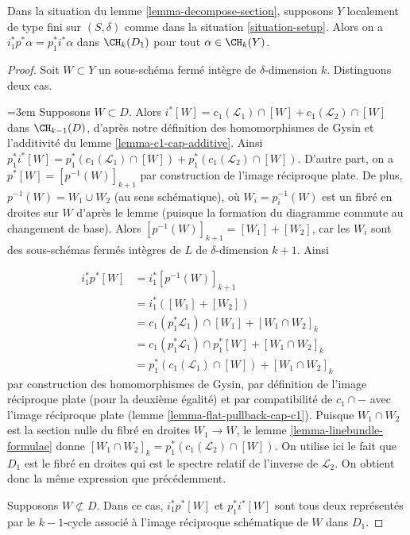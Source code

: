 \begin{lemma}
\label{lemma-decompose-section-formulae}
Dans la situation du lemme \ref{lemma-decompose-section},
supposons $Y$ localement de type fini sur $(S, \delta)$ comme dans la
situation \ref{situation-setup}. Alors on a
$i_1^*p^*\alpha = p_1^*i^*\alpha$
dans $\CH_k(D_1)$ pour tout $\alpha \in \CH_k(Y)$.
\end{lemma}

\begin{proof}
Soit $W \subset Y$ un sous-schéma fermé intègre de $\delta$-dimension $k$.
Distinguons deux cas.

{\emergencystretch=3em\medskip\noindent
Supposons $W \subset D$. Alors
$i^*[W] = c_1(\mathcal{L}_1) \cap [W] + c_1(\mathcal{L}_2) \cap [W]$
dans $\CH_{k - 1}(D)$, d'après notre définition des homomorphismes de Gysin et
l'additivité du lemme \ref{lemma-c1-cap-additive}.
Ainsi $p_1^*i^*[W] =
p_1^*(c_1(\mathcal{L}_1) \cap [W]) + p_1^*(c_1(\mathcal{L}_2) \cap [W])$.
D'autre part, on a
$p^*[W] = [p^{-1}(W)]_{k + 1}$ par construction de l'image réciproque plate.
De plus, $p^{-1}(W) = W_1 \cup W_2$ (au sens schématique),
où $W_i = p_i^{-1}(W)$ est un fibré en droites sur $W$
d'après le lemme (puisque la formation du diagramme commute au changement de base).
Alors $[p^{-1}(W)]_{k + 1} = [W_1] + [W_2]$, car les $W_i$ sont des sous-schémas fermés
intègres de $L$ de $\delta$-dimension $k + 1$. Ainsi\par}
\begin{align*}
i_1^*p^*[W]
& =
i_1^*[p^{-1}(W)]_{k + 1} \\
& =
i_1^*([W_1] + [W_2]) \\
& =
c_1(p_1^*\mathcal{L}_1) \cap [W_1] + [W_1 \cap W_2]_k \\
& =
c_1(p_1^*\mathcal{L}_1) \cap p_1^*[W] + [W_1 \cap W_2]_k \\
& =
p_1^*(c_1(\mathcal{L}_1) \cap [W]) + [W_1 \cap W_2]_k
\end{align*}
par construction des homomorphismes de Gysin, par définition de l'image réciproque plate
(pour la deuxième égalité) et par compatibilité de $c_1 \cap -$
avec l'image réciproque plate (lemme \ref{lemma-flat-pullback-cap-c1}).
Puisque $W_1 \cap W_2$ est la section nulle du fibré en droites
$W_1 \to W$, le lemme \ref{lemma-linebundle-formulae} donne
$[W_1 \cap W_2]_k = p_1^*(c_1(\mathcal{L}_2) \cap [W])$.
On utilise ici le fait que $D_1$ est le fibré en droites
qui est le spectre relatif de l'inverse de $\mathcal{L}_2$.
On obtient donc la même expression que précédemment.

\medskip\noindent
Supposons $W \not \subset D$. Dans ce cas, $i_1^*p^*[W]$
et $p_1^*i^*[W]$ sont tous deux représentés par le $k - 1$-cycle associé
à l'image réciproque schématique de $W$ dans $D_1$.
\end{proof}

